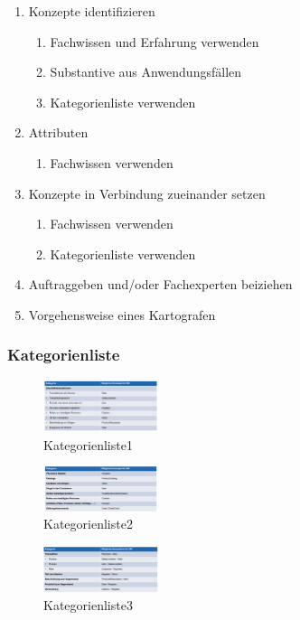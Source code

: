 \documentclass[../ZF_SWEN1.tex]{subfiles}
\begin{document}
\begin{enumerate}
	\item Konzepte identifizieren
	\begin{enumerate}
		\item Fachwissen und Erfahrung verwenden
		\item Substantive aus Anwendungsfällen
		\item Kategorienliste verwenden
	\end{enumerate}
	\item Attributen
		\begin{enumerate}
		\item Fachwissen verwenden
	\end{enumerate}
	\item Konzepte in Verbindung zueinander setzen
			\begin{enumerate}
		\item Fachwissen verwenden
		\item Kategorienliste verwenden
	\end{enumerate}
	\item Auftraggeben und/oder Fachexperten beiziehen
	\item Vorgehensweise eines Kartografen
	
\end{enumerate}

\subsubsection{Kategorienliste}

\begin{multicols}{3}
\begin{figure}[H]
	\centering
	\includegraphics[width=0.3\textwidth] {Resources/Images/Kategorienliste1.png}
	\caption{\label{fig:Kategorienliste1}Kategorienliste1}
	\end{figure}


\columnbreak
\begin{figure}[H]
	\centering
	\includegraphics[width=0.3\textwidth] {Resources/Images/Kategorienliste2.png}
	\caption{\label{fig:Kategorienliste2}Kategorienliste2}
	\end{figure}
\columnbreak
\begin{figure}[H]
	\centering
	\includegraphics[width=0.3\textwidth] {Resources/Images/Kategorienliste3.png}
	\caption{\label{fig:Kategorienliste3}Kategorienliste3}
	\end{figure}
\end{multicols}
\end{document}
